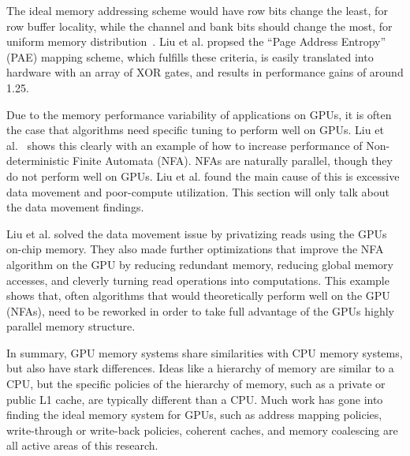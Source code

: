 The ideal memory addressing scheme would have row bits change the least, for row buffer locality, while the channel and bank bits should change the most, for uniform memory distribution~\cite{Liu2018}.
Liu et al. propsed the ``Page Address Entropy'' (PAE) mapping scheme, which fulfills these criteria, is easily translated into hardware with an array of XOR gates, and results in performance gains of around 1.25.

Due to the memory performance variability of applications on GPUs, it is often the case that algorithms need specific tuning to perform well on GPUs.
Liu et al.~\cite{Liu2020} shows this clearly with an example of how to increase performance of Non-deterministic Finite Automata (NFA). NFAs are naturally parallel, though they do not perform well on GPUs. Liu et al. found the main cause of this is excessive data movement and poor-compute utilization. This section will only talk about the data movement findings.

Liu et al. solved the data movement issue by privatizing reads using the GPUs on-chip memory.
They also made further optimizations that improve the NFA algorithm on the GPU by reducing redundant memory, reducing global memory accesses, and cleverly turning read operations into computations.
This example shows that, often algorithms that would theoretically perform well on the GPU (NFAs), need to be reworked in order to take full advantage of the GPUs highly parallel memory structure.

In summary, GPU memory systems share similarities with CPU memory systems, but also have stark differences.
Ideas like a hierarchy of memory are similar to a CPU, but the specific policies of the hierarchy of memory, such as a private or public L1 cache, are typically different than a CPU.
Much work has gone into finding the ideal memory system for GPUs, such as address mapping policies, write-through or write-back policies, coherent caches, and memory coalescing are all active areas of this research.

